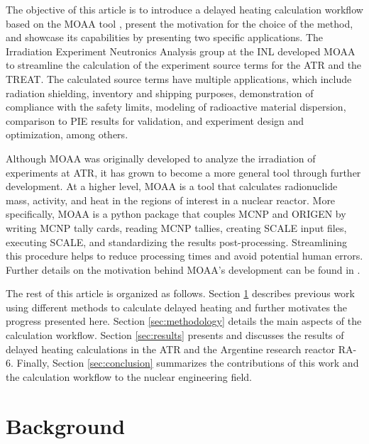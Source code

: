 \documentclass{style/nseJournal}
\begin{document}
The objective of this article is to introduce a delayed heating calculation workflow based on the \gls*{MOAA} tool \cite{fairhurst_moaa_2022, fairhurst_decay_2022, fairhurst_demonstration_2022, fairhurst_database_2022}, present the motivation for the choice of the method, and showcase its capabilities by presenting two specific applications.
The Irradiation Experiment Neutronics Analysis group at the \gls*{INL} developed MOAA to streamline the calculation of the experiment source terms for the \gls*{ATR} and the \gls*{TREAT}.
The calculated source terms have multiple applications, which include radiation shielding, inventory and shipping purposes, demonstration of compliance with the safety limits, modeling of radioactive material dispersion, comparison to \gls*{PIE} results for validation, and experiment design and optimization, among others.

Although MOAA was originally developed to analyze the irradiation of experiments at ATR, it has grown to become a more general tool through further development.
At a higher level, MOAA is a tool that calculates radionuclide mass, activity, and heat in the regions of interest in a nuclear reactor.
More specifically, MOAA is a python package that couples MCNP \cite{mcnp} and ORIGEN by writing MCNP tally cards, reading MCNP tallies, creating SCALE input files, executing SCALE, and standardizing the results post-processing.
Streamlining this procedure helps to reduce processing times and avoid potential human errors.
Further details on the motivation behind MOAA's development can be found in \cite{fairhurst_moaa_2022}.

The rest of this article is organized as follows.
Section \ref{sec:background} describes previous work using different methods to calculate delayed heating and further motivates the progress presented here.
Section \ref{sec:methodology} details the main aspects of the calculation workflow.
Section \ref{sec:results} presents and discusses the results of delayed heating calculations in the ATR and the Argentine research reactor RA-6.
Finally, Section \ref{sec:conclusion} summarizes the contributions of this work and the calculation workflow to the nuclear engineering field.


\section{Background}
\label{sec:background}
\end{document}
